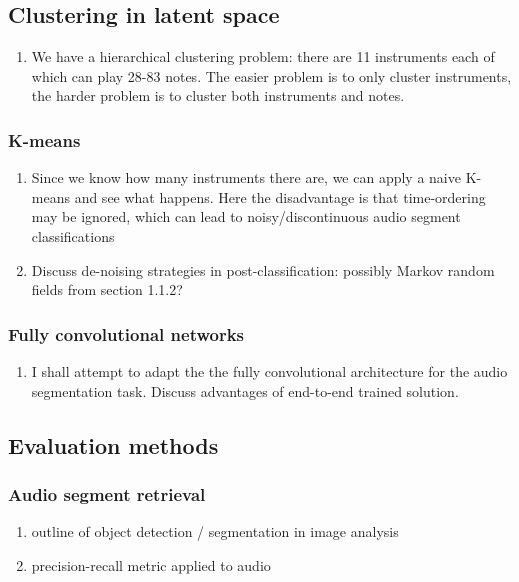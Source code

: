 \documentclass{article}[12pt]
\numberwithin{equation}{section}
\begin{document}
\subsection{Clustering in latent space}
\begin{enumerate}
	\item We have a hierarchical clustering problem: there are 11 instruments each
	of which can play 28-83 notes. The easier problem is to only cluster instruments,
	the harder problem is to cluster both instruments and notes.
\end{enumerate}

\subsubsection{K-means}

\begin{enumerate}
	\item Since we know how many instruments there are, we can apply a naive K-means
	and see what happens. Here the disadvantage is that time-ordering may be
	ignored, which can lead to noisy/discontinuous audio segment classifications
	\item Discuss de-noising strategies in post-classification: possibly Markov
	random fields from section 1.1.2?
\end{enumerate}

\subsubsection{Fully convolutional networks}
\begin{enumerate}
	\item I shall attempt to adapt the the fully convolutional architecture \cite{Long2015}
	for the audio segmentation task. Discuss advantages of end-to-end trained solution.
\end{enumerate}

\subsection{Evaluation methods}
\subsubsection{Audio segment retrieval}
\begin{enumerate}
	\item outline of object detection / segmentation in image analysis
	\item precision-recall metric applied to audio
\end{enumerate}
\end{document}
